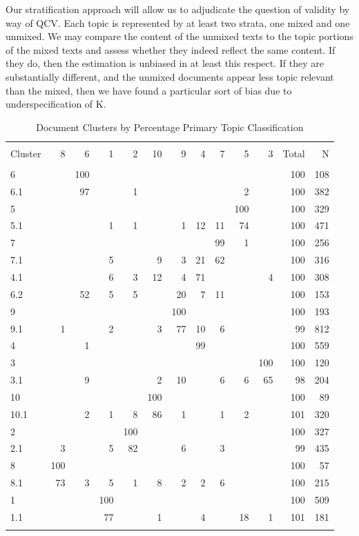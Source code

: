 \documentclass[]{book}
\theoremstyle{definition}
\theoremstyle{definition}
\theoremstyle{definition}
\theoremstyle{remark}
\begin{document}
Our stratification approach will allow us to adjudicate the question of
validity by way of QCV. Each topic is represented by at least two
strata, one mixed and one unmixed. We may compare the content of the
unmixed texts to the topic portions of the mixed texts and assess
whether they indeed reflect the same content. If they do, then the
estimation is unbiased in at least this respect. If they are
substantially different, and the unmixed documents appear less topic
relevant than the mixed, then we have found a particular sort of bias
due to underspecification of K.

\begin{table}[!htbp] \centering 
  \caption{Document Clusters by Percentage Primary Topic Classification} 
  \label{tab:hottable} 
\begin{tabular}{@{\extracolsep{5pt}} lrrrrrrrrrrrr} 
\\[-1.8ex]\hline 
\hline \\[-1.8ex] 
Cluster & 8 & 6 & 1 & 2 & 10 & 9 & 4 & 7 & 5 & 3 & Total & N \\ 
\hline \\[-1.8ex] 
6 &  & 100 &  &  &  &  &  &  &  &  & 100 & 108 \\ 
6.1 &  & 97 &  & 1 &  &  &  &  & 2 &  & 100 & 382 \\ 
5 &  &  &  &  &  &  &  &  & 100 &  & 100 & 329 \\ 
5.1 &  &  & 1 & 1 &  & 1 & 12 & 11 & 74 &  & 100 & 471 \\ 
7 &  &  &  &  &  &  &  & 99 & 1 &  & 100 & 256 \\ 
7.1 &  &  & 5 &  & 9 & 3 & 21 & 62 &  &  & 100 & 316 \\ 
4.1 &  &  & 6 & 3 & 12 & 4 & 71 &  &  & 4 & 100 & 308 \\ 
6.2 &  & 52 & 5 & 5 &  & 20 & 7 & 11 &  &  & 100 & 153 \\ 
9 &  &  &  &  &  & 100 &  &  &  &  & 100 & 193 \\ 
9.1 & 1 &  & 2 &  & 3 & 77 & 10 & 6 &  &  & 99 & 812 \\ 
4 &  & 1 &  &  &  &  & 99 &  &  &  & 100 & 559 \\ 
3 &  &  &  &  &  &  &  &  &  & 100 & 100 & 120 \\ 
3.1 &  & 9 &  &  & 2 & 10 &  & 6 & 6 & 65 & 98 & 204 \\ 
10 &  &  &  &  & 100 &  &  &  &  &  & 100 & 89 \\ 
10.1 &  & 2 & 1 & 8 & 86 & 1 &  & 1 & 2 &  & 101 & 320 \\ 
2 &  &  &  & 100 &  &  &  &  &  &  & 100 & 327 \\ 
2.1 & 3 &  & 5 & 82 &  & 6 &  & 3 &  &  & 99 & 435 \\ 
8 & 100 &  &  &  &  &  &  &  &  &  & 100 & 57 \\ 
8.1 & 73 & 3 & 5 & 1 & 8 & 2 & 2 & 6 &  &  & 100 & 215 \\ 
1 &  &  & 100 &  &  &  &  &  &  &  & 100 & 509 \\ 
1.1 &  &  & 77 &  & 1 &  & 4 &  & 18 & 1 & 101 & 181 \\ 
\hline \\[-1.8ex] 
\end{tabular} 
\end{table}
\end{document}
